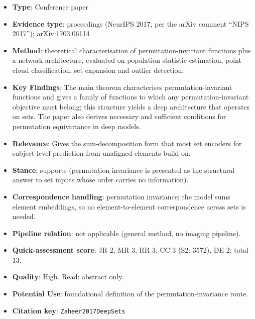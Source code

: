 \documentclass[journal,onecolumn]{IEEEtran}
\begin{document}
\begin{itemize}

\item{} \textbf{Type}: Conference paper

\item{} \textbf{Evidence type}: proceedings (NeurIPS 2017, per the arXiv comment ``NIPS 2017''); arXiv:1703.06114

\item{} \textbf{Method}: theoretical characterisation of permutation-invariant functions plus a network architecture, evaluated on population statistic estimation, point cloud classification, set expansion and outlier detection.

\item{} \textbf{Key Findings}: The main theorem characterises permutation-invariant functions and gives a family of functions to which any permutation-invariant objective must belong; this structure yields a deep architecture that operates on sets. The paper also derives necessary and sufficient conditions for permutation equivariance in deep models.

\item{} \textbf{Relevance}: Gives the sum-decomposition form that most set encoders for subject-level prediction from unaligned elements build on.

\item{} \textbf{Stance}: supports (permutation invariance is presented as the structural answer to set inputs whose order carries no information).

\item{} \textbf{Correspondence handling}: permutation invariance; the model sums element embeddings, so no element-to-element correspondence across sets is needed.

\item{} \textbf{Pipeline relation}: not applicable (general method, no imaging pipeline).

\item{} \textbf{Quick-assessment score}: JR 2, MR 3, RR 3, CC 3 (S2: 3572), DE 2; total 13.

\item{} \textbf{Quality}: High. Read: abstract only.

\item{} \textbf{Potential Use}: foundational definition of the permutation-invariance route.

\item{} \textbf{Citation key}: \texttt{Zaheer2017DeepSets}

\end{itemize}
\end{document}
